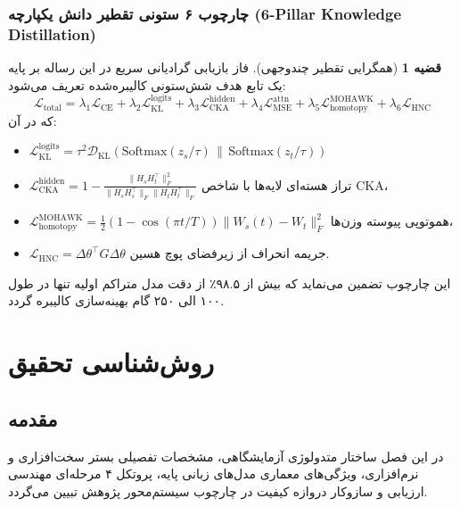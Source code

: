 \documentclass[12pt,a4paper]{report}
\theoremstyle{definition}
\newtheorem{theorem}{قضیه}[chapter]
\begin{document}
\subsection{چارچوب ۶ ستونی تقطیر دانش یکپارچه (6-Pillar Knowledge Distillation)}
\begin{theorem}[همگرایی تقطیر چندوجهی]
\label{thm:six_pillar_kd}
فاز بازیابی گرادیانی سریع در این رساله بر پایه یک تابع هدف شش‌ستونی کالیبره‌شده تعریف می‌شود:
\begin{equation}
\mathcal{L}_{\text{total}} = \lambda_1 \mathcal{L}_{\text{CE}} + \lambda_2 \mathcal{L}_{\text{KL}}^{\text{logits}} + \lambda_3 \mathcal{L}_{\text{CKA}}^{\text{hidden}} + \lambda_4 \mathcal{L}_{\text{MSE}}^{\text{attn}} + \lambda_5 \mathcal{L}_{\text{homotopy}}^{\text{MOHAWK}} + \lambda_6 \mathcal{L}_{\text{HNC}}
\end{equation}
که در آن:
\begin{itemize}
    \item $\mathcal{L}_{\text{KL}}^{\text{logits}} = \tau^2 \mathcal{D}_{\text{KL}}\left(\text{Softmax}(z_s/\tau) \,\|\, \text{Softmax}(z_t/\tau)\right)$
    \item $\mathcal{L}_{\text{CKA}}^{\text{hidden}} = 1 - \frac{\| H_s H_t^\top \|_F^2}{\| H_s H_s^\top \|_F \| H_t H_t^\top \|_F}$ تراز هسته‌ای لایه‌ها با شاخص CKA،
    \item $\mathcal{L}_{\text{homotopy}}^{\text{MOHAWK}} = \frac{1}{2} (1 - \cos(\pi t / T)) \| W_s(t) - W_t \|_F^2$ هموتوپی پیوسته وزن‌ها،
    \item $\mathcal{L}_{\text{HNC}} = \Delta \theta^\top G \Delta \theta$ جریمه انحراف از زیرفضای پوچ هسین.
\end{itemize}
این چارچوب تضمین می‌نماید که بیش از ۹۸.۵٪ از دقت مدل متراکم اولیه تنها در طول ۱۰۰ الی ۲۵۰ گام بهینه‌سازی کالیبره گردد.
\end{theorem}

\chapter{روش‌شناسی تحقیق}
\label{chap:methodology}

\section{مقدمه}
در این فصل ساختار متدولوژی آزمایشگاهی، مشخصات تفصیلی بستر سخت‌افزاری و نرم‌افزاری، ویژگی‌های معماری مدل‌های زبانی پایه، پروتکل ۴ مرحله‌ای مهندسی ارزیابی و سازوکار دروازه کیفیت  در چارچوب سیستم‌محور پژوهش تبیین می‌گردد.
\end{document}

